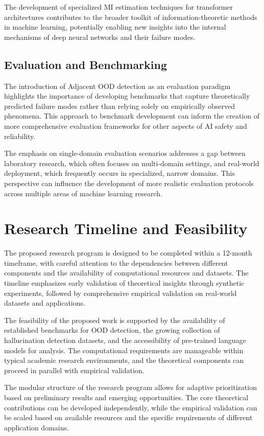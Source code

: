 \documentclass[11pt, oneside]{book}
\theoremstyle{plain}
\theoremstyle{definition}
\theoremstyle{remark}
\begin{document}
The development of specialized MI estimation techniques for transformer architectures contributes to the broader toolkit of information-theoretic methods in machine learning, potentially enabling new insights into the internal mechanisms of deep neural networks and their failure modes.

\subsection{Evaluation and Benchmarking}

The introduction of Adjacent OOD detection as an evaluation paradigm highlights the importance of developing benchmarks that capture theoretically predicted failure modes rather than relying solely on empirically observed phenomena. This approach to benchmark development can inform the creation of more comprehensive evaluation frameworks for other aspects of AI safety and reliability.

The emphasis on single-domain evaluation scenarios addresses a gap between laboratory research, which often focuses on multi-domain settings, and real-world deployment, which frequently occurs in specialized, narrow domains. This perspective can influence the development of more realistic evaluation protocols across multiple areas of machine learning research.

\section{Research Timeline and Feasibility}

The proposed research program is designed to be completed within a 12-month timeframe, with careful attention to the dependencies between different components and the availability of computational resources and datasets. The timeline emphasizes early validation of theoretical insights through synthetic experiments, followed by comprehensive empirical validation on real-world datasets and applications.

The feasibility of the proposed work is supported by the availability of established benchmarks for OOD detection, the growing collection of hallucination detection datasets, and the accessibility of pre-trained language models for analysis. The computational requirements are manageable within typical academic research environments, and the theoretical components can proceed in parallel with empirical validation.

The modular structure of the research program allows for adaptive prioritization based on preliminary results and emerging opportunities. The core theoretical contributions can be developed independently, while the empirical validation can be scaled based on available resources and the specific requirements of different application domains.
\end{document}
